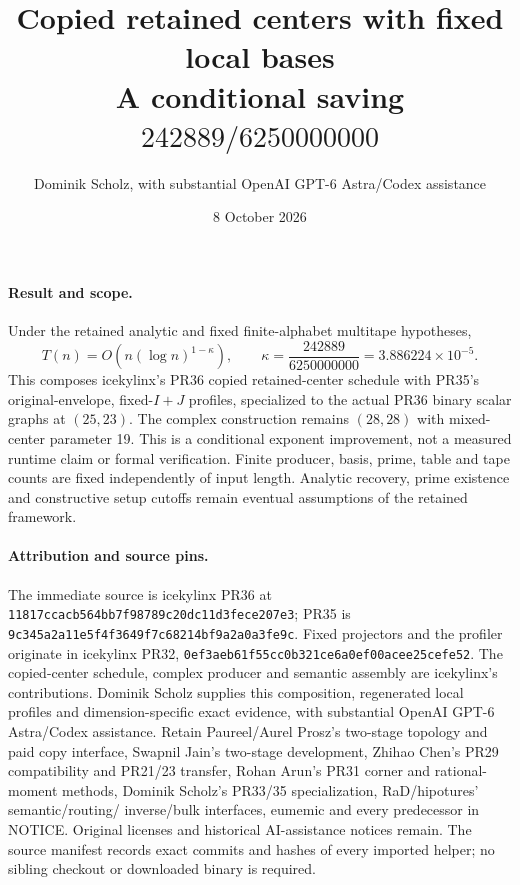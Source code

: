 \documentclass[11pt]{article}
\begin{document}
\title{Copied retained centers with fixed local bases\\
\large A conditional saving $242889/6250000000$}
\author{Dominik Scholz, with substantial OpenAI GPT-6 Astra/Codex assistance}
\date{8 October 2026}\maketitle

\paragraph{Result and scope.}
Under the retained analytic and fixed finite-alphabet multitape hypotheses,
\[
 T(n)=O\!\left(n(\log n)^{1-\kappa}\right),\qquad
 \kappa=\frac{242889}{6250000000}=3.886224\times10^{-5}.
\]
This composes icekylinx's PR36 copied retained-center schedule with
PR35's original-envelope, fixed-$I+J$ profiles, specialized to the actual
PR36 binary scalar graphs at $(25,23)$. The complex construction remains
$(28,28)$ with mixed-center parameter 19. This is a conditional exponent
improvement, not a measured runtime claim or formal verification.
Finite producer, basis, prime, table and tape counts are fixed independently
of input length. Analytic recovery, prime existence and constructive setup
cutoffs remain eventual assumptions of the retained framework.

\paragraph{Attribution and source pins.}
The immediate source is icekylinx PR36 at
\texttt{11817ccacb564bb7f98789c20dc11d3fece207e3}; PR35 is
\texttt{9c345a2a11e5f4f3649f7c68214bf9a2a0a3fe9c}.
Fixed projectors and the profiler originate in icekylinx PR32,
\texttt{0ef3aeb61f55cc0b321ce6a0ef00acee25cefe52}.
The copied-center schedule, complex producer and semantic assembly are
icekylinx's contributions. Dominik Scholz supplies this composition,
regenerated local profiles and dimension-specific exact evidence, with
substantial OpenAI GPT-6 Astra/Codex assistance.
Retain Paureel/Aurel Prosz's two-stage topology and paid copy interface,
Swapnil Jain's two-stage development, Zhihao Chen's PR29 compatibility and
PR21/23 transfer, Rohan Arun's PR31 corner and rational-moment methods,
Dominik Scholz's PR33/35 specialization, RaD/hipotures' semantic/routing/
inverse/bulk interfaces, eumemic and every predecessor in NOTICE.
Original licenses and historical AI-assistance notices remain.
The source manifest records exact commits and hashes of every imported
helper; no sibling checkout or downloaded binary is required.
\end{document}
